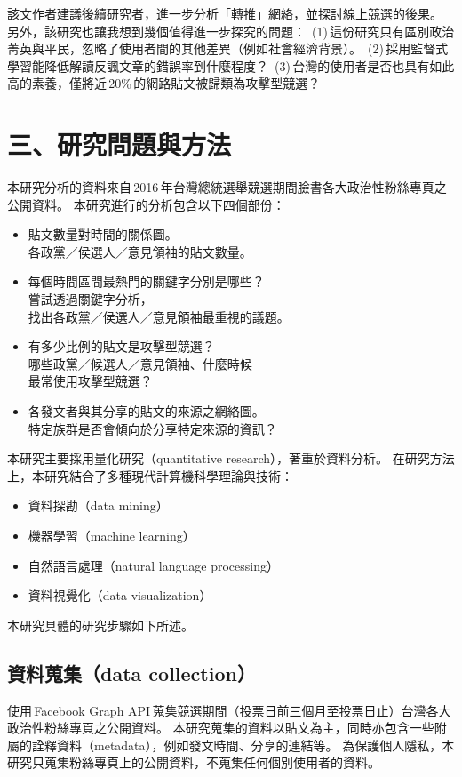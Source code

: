 \documentclass[letterpaper, 10pt, conference]{ieeeconf}   %
\begin{document}
\begin{CJK}{UTF8}{bsmi}
該文作者建議後續研究者，進一步分析「轉推」網絡，並探討線上競選的後果。
另外，該研究也讓我想到幾個值得進一步探究的問題：
\,(1)\,這份研究只有區別政治菁英與平民，忽略了使用者間的其他差異（例如社會經濟背景）。
\,(2)\,採用監督式學習能降低解讀反諷文章的錯誤率到什麼程度？
\,(3)\,台灣的使用者是否也具有如此高的素養，僅將近\,20\%\,的網路貼文被歸類為攻擊型競選？

\section*{三、研究問題與方法}

本研究分析的資料來自\,2016\,年台灣總統選舉競選期間臉書各大政治性粉絲專頁之公開資料。
本研究進行的分析包含以下四個部份：
\begin{itemize}
\item 貼文數量對時間的關係圖。\\
各政黨／侯選人／意見領袖的貼文數量。
\item 每個時間區間最熱門的關鍵字分別是哪些？\\
嘗試透過關鍵字分析，\\
找出各政黨／侯選人／意見領袖最重視的議題。
\item 有多少比例的貼文是攻擊型競選？\\
哪些政黨／候選人／意見領袖、什麼時候\\
最常使用攻擊型競選？
\item 各發文者與其分享的貼文的來源之網絡圖。\\
特定族群是否會傾向於分享特定來源的資訊？
\end{itemize}

本研究主要採用量化研究（quantitative research），著重於資料分析。
在研究方法上，本研究結合了多種現代計算機科學理論與技術：
\begin{itemize}
\item 資料探勘（data mining）
\item 機器學習（machine learning）
\item 自然語言處理（natural language processing）
\item 資料視覺化（data visualization）
\end{itemize}

本研究具體的研究步驟如下所述。

\subsection*{資料蒐集（data collection）}

使用\,Facebook Graph API\,蒐集競選期間（投票日前三個月至投票日止）台灣各大政治性粉絲專頁之公開資料。
本研究蒐集的資料以貼文為主，同時亦包含一些附屬的詮釋資料（metadata），例如發文時間、分享的連結等。
為保護個人隱私，本研究只蒐集粉絲專頁上的公開資料，不蒐集任何個別使用者的資料。


\end{CJK}
\end{document}
